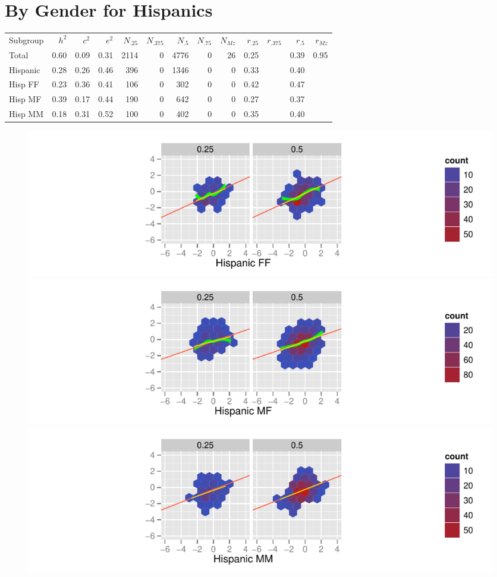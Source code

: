 \documentclass[a4paper]{article}
\begin{document}
\newpage
\section{By Gender for Hispanics}
\begin{table}[ht]
\begin{center}
\begin{tabular}{l|rrr|rrrrr|rrrr}
 Subgroup & $h^2$ & $c^2$ & $e^2$ & $N_{.25}$ & $N_{.375}$ & $N_{.5}$ & $N_{.75}$ & $N_{Mz}$ & $r_{.25}$ & $r_{.375}$ & $r_{.5}$ & $r_{Mz}$ \\ 
 Total & 0.60 & 0.09 & 0.31 & 2114 &   0 & 4776 &   0 &  26 & 0.25 &  & 0.39 & 0.95 \\ 
   \hline
Hispanic & 0.28 & 0.26 & 0.46 & 396 &   0 & 1346 &   0 &   0 & 0.33 &  & 0.40 &  \\ 
  Hisp FF & 0.23 & 0.36 & 0.41 & 106 &   0 & 302 &   0 &   0 & 0.42 &  & 0.47 &  \\ 
  Hisp MF & 0.39 & 0.17 & 0.44 & 190 &   0 & 642 &   0 &   0 & 0.27 &  & 0.37 &  \\ 
  Hisp MM & 0.18 & 0.31 & 0.52 & 100 &   0 & 402 &   0 &   0 & 0.35 &  & 0.40 &  \\ 
  \end{tabular}
\end{center}
\end{table}\begin{figure}[htbp]
\includegraphics{Height-014}
\includegraphics{Height-015}
\includegraphics{Height-016}
\end{figure}
\end{document}

